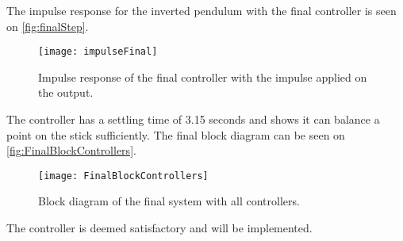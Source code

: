 The impulse response for the inverted pendulum with the final controller is seen on \autoref{fig:finalStep}.
\begin{figure}[htbp]
\centering
\texttt{[image: impulseFinal]}
\caption{Impulse response of the final controller with the impulse applied on the output.}
\label{fig:finalStep}
\end{figure}

The controller has a settling time of 3.15 seconds and shows it can balance a point on the stick sufficiently. The final block diagram can be seen on \autoref{fig:FinalBlockControllers}.
\begin{figure}[htbp]
\centering
\texttt{[image: FinalBlockControllers]}
\caption{Block diagram of the final system with all controllers.}
\label{fig:FinalBlockControllers}
\end{figure}

The controller is deemed satisfactory and will be implemented.